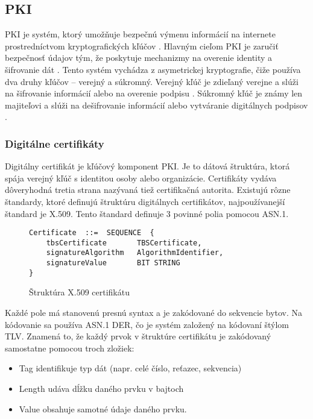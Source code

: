\documentclass[12pt, twoside]{book}
\begin{document}
\subsection{PKI}
PKI je systém, ktorý umožňuje bezpečnú výmenu informácií na internete prostredníctvom kryptografických kľúčov \cite{pki}. Hlavným cieľom PKI je zaručiť bezpečnosť údajov tým, že poskytuje mechanizmy na overenie identity a šifrovanie dát \cite{pki2}. Tento systém vychádza z asymetrickej kryptografie, čiže používa dva druhy kľúčov – verejný a súkromný. Verejný kľúč je zdieľaný verejne a slúži na šifrovanie informácií alebo na overenie podpisu \cite{pki}. Súkromný kľúč je známy len majiteľovi a slúži na dešifrovanie informácií alebo vytváranie digitálnych podpisov \cite{pki2}.


\subsubsection{Digitálne certifikáty}
Digitálny certifikát je kľúčový komponent PKI.\cite{certs} Je to dátová štruktúra, ktorá spája verejný kľúč s identitou osoby alebo organizácie. Certifikáty vydáva dôveryhodná tretia strana nazývaná tiež certifikačná autorita. Existujú rôzne štandardy, ktoré definujú štruktúru digitálnych certifikátov, najpoužívanejší štandard je X.509.\cite{certs} Tento štandard definuje 3 povinné polia pomocou ASN.1.\cite{x509}

\begin{figure}[H]
\begin{lstlisting}
Certificate  ::=  SEQUENCE  {
    tbsCertificate       TBSCertificate,
    signatureAlgorithm   AlgorithmIdentifier,
    signatureValue       BIT STRING
}
\end{lstlisting}
\caption{Štruktúra X.509 certifikátu}
\end{figure}

Každé pole má stanovenú presnú syntax a je zakódované do sekvencie bytov. Na kódovanie sa používa ASN.1 DER, čo je systém založený na kódovaní štýlom TLV. Znamená to, že každý prvok v štruktúre certifikátu je zakódovaný samostatne pomocou troch zložiek:\cite{asn1}
\begin{itemize}
\item Tag identifikuje typ dát (napr. celé číslo, reťazec, sekvencia)
\item Length udáva dĺžku daného prvku v bajtoch
\item Value obsahuje samotné údaje daného prvku.
\end{itemize}
\end{document}

